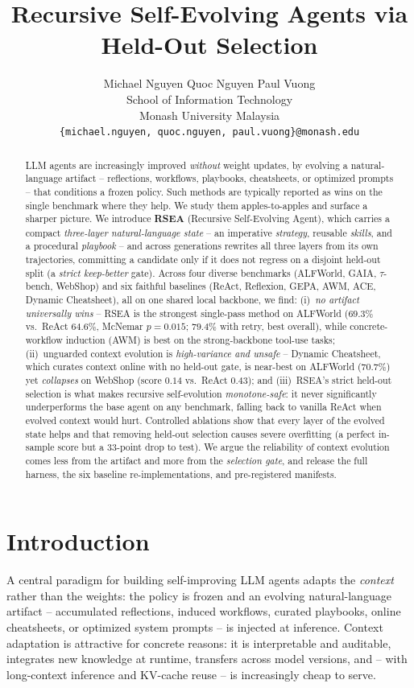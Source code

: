 \documentclass{article}
\title{Recursive Self-Evolving Agents via Held-Out Selection}
\author{%
  Michael Nguyen \quad Quoc Nguyen \quad Paul Vuong \\
  School of Information Technology\\
  Monash University Malaysia\\
  \texttt{\{michael.nguyen, quoc.nguyen, paul.vuong\}@monash.edu}
}
\begin{document}
\maketitle

\begin{abstract}
LLM agents are increasingly improved \emph{without} weight updates, by evolving a
natural-language artifact -- reflections, workflows, playbooks, cheatsheets, or
optimized prompts -- that conditions a frozen policy. Such methods are typically
reported as wins on the single benchmark where they help. We study them
apples-to-apples and surface a sharper picture. We introduce \textbf{RSEA}
(Recursive Self-Evolving Agent), which carries a compact \emph{three-layer
natural-language state} -- an imperative \emph{strategy}, reusable \emph{skills},
and a procedural \emph{playbook} -- and across generations rewrites all three layers
from its own trajectories, committing a candidate only if it does not regress on a
disjoint held-out split (a \emph{strict keep-better} gate). Across four diverse
benchmarks (ALFWorld, GAIA, $\tau$-bench, WebShop) and six faithful baselines
(ReAct, Reflexion, GEPA, AWM, ACE, Dynamic Cheatsheet), all on one shared local
backbone, we find: (i)~\emph{no artifact universally wins} -- RSEA is the strongest
single-pass method on ALFWorld ($69.3\%$ vs.\ ReAct $64.6\%$, McNemar $p{=}0.015$;
$79.4\%$ with retry, best overall), while concrete-workflow induction (AWM) is best
on the strong-backbone tool-use tasks; (ii)~unguarded context evolution is
\emph{high-variance and unsafe} -- Dynamic Cheatsheet, which curates context online
with no held-out gate, is near-best on ALFWorld ($70.7\%$) yet \emph{collapses} on
WebShop (score $0.14$ vs.\ ReAct $0.43$); and (iii)~RSEA's strict held-out selection
is what makes recursive self-evolution \emph{monotone-safe}: it never significantly
underperforms the base agent on any benchmark, falling back to vanilla ReAct when
evolved context would hurt. Controlled ablations show that every layer of
the evolved state helps and that removing held-out selection causes severe
overfitting (a perfect in-sample score but a $33$-point drop to test). We argue the
reliability of context evolution comes less from the
artifact and more from the \emph{selection gate}, and release the full harness, the
six baseline re-implementations, and pre-registered manifests.
\end{abstract}

\section{Introduction}
A central paradigm for building self-improving LLM agents adapts the \emph{context}
rather than the weights: the policy is frozen and an evolving natural-language
artifact -- accumulated reflections, induced workflows, curated playbooks, online
cheatsheets, or optimized system prompts -- is injected at inference. Context
adaptation is attractive for concrete reasons: it is interpretable and auditable,
integrates new knowledge at runtime, transfers across model versions, and -- with
long-context inference and KV-cache reuse -- is increasingly cheap to serve.
\end{document}
